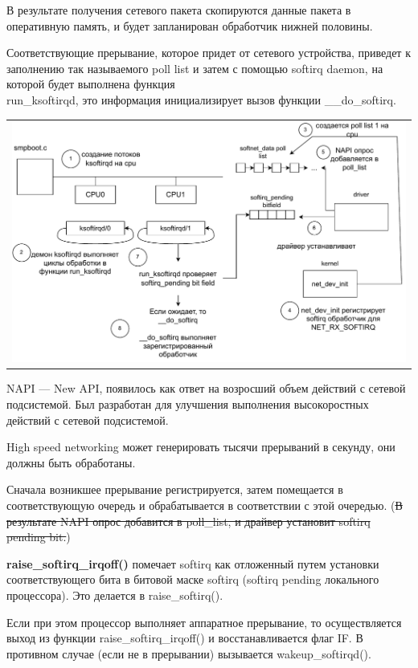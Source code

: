 В результате получения сетевого пакета скопируются данные пакета в оперативную память, и будет запланирован обработчик нижней половины. 

Соответствующие прерывание, которое придет от сетевого устройства, приведет к заполнению так называемого poll list и затем с помощью softirq daemon, на которой будет выполнена функция \\ run\_ksoftirqd, это информация инициализирует вызов функции \_\_do\_softirq.

\begin{table}[h!]
  \centering
  \begin{tabular}{p{1\linewidth}}
    \centering
    \includegraphics[width=0.8\linewidth]{./images/softirq.pdf}
  \end{tabular}
\end{table}

NAPI --- New API, появилось как ответ на возросший объем действий с сетевой подсистемой. Был разработан для улучшения выполнения высокоростных действий с сетевой подсистемой. 

High speed networking может генерировать тысячи прерываний в секунду, они должны быть обработаны.

Сначала возникшее прерывание регистрируется, затем помещается в соответствующую очередь и обрабатывается в соответствии с этой очередью. (\sout{В результате NAPI опрос добавится в poll\_list, и драйвер установит softirq pending bit.})

\textbf{raise\_softirq\_irqoff()} помечает softirq как отложенный путем установки соответствующего бита в битовой маске softirq (softirq pending локального процессора). Это делается в raise\_softirq(). 

Если при этом процессор выполняет аппаратное прерывание, то осуществляется выход из функции raise\_softirq\_irqoff() и восстанавливается флаг IF. В противном случае (если не в прерывании) вызывается wakeup\_softirqd(). 

